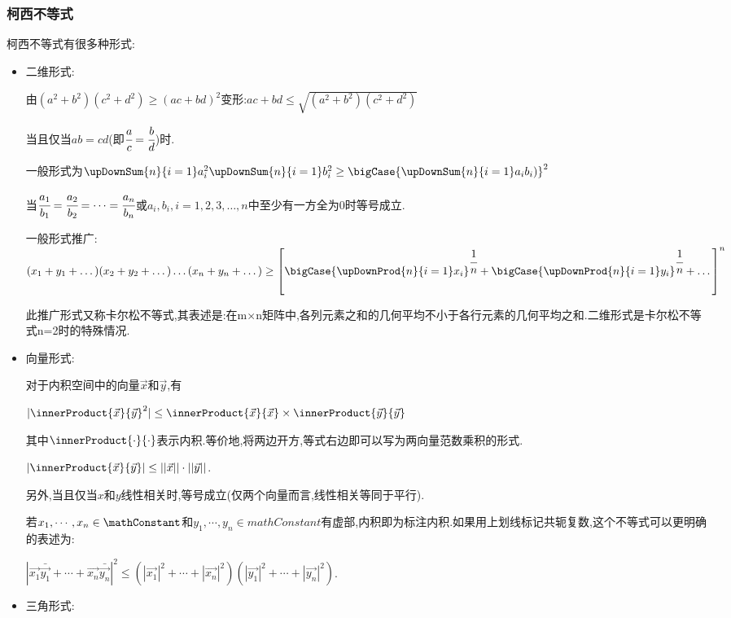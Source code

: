 {{\subsubsection{柯西不等式}{
    柯西不等式有很多种形式:
    \begin{itemize}
        \item {
              二维形式:

              由$(a^2 + b^2)(c^2 + d^2)\geq(ac + bd)^2$变形:$ac + bd \leq \sqrt{(a^2 + b^2)(c^2 + d^2)}$

              当且仅当$ab = cd$(即$\cfrac{a}{c} = \cfrac{b}{d}$)时.

              一般形式为$\upDownSum{n}{i = 1}a_i^2\upDownSum{n}{i = 1}b_i^2\geq\bigCase{\upDownSum{n}{i = 1}a_ib_i)}^2$

              当$\cfrac{a_1}{b_1} = \cfrac{a_2}{b_2} = \dots = \cfrac{a_n}{b_n}$或$a_i,b_i,i = 1,2,3,\dots,n$中至少有一方全为$0$时等号成立.

              一般形式推广:$(x_1 + y_1 + \dots)(x_2 + y_2 + \dots)\dots(x_n + y_n + \dots) \geq \left[\bigCase{\upDownProd{n}{i = 1}x_i}^{\cfrac{1}{n}} + \bigCase{\upDownProd{n}{i = 1}y_i}^{\cfrac{1}{n}} + \dots\right]^n$

              此推广形式又称卡尔松不等式,其表述是:在m×n矩阵中,各列元素之和的几何平均不小于各行元素的几何平均之和.二维形式是卡尔松不等式n=2时的特殊情况.
              }
        \item {
              向量形式:

              对于内积空间中的向量$\vec{x}$和$\vec{y}$,有

              $|\innerProduct{\vec{x}}{\vec{y}}^2| \leq \innerProduct{\vec{x}}{\vec{x}} \times \innerProduct{\vec{y}}{\vec{y}}$

              其中$\innerProduct{\cdot}{\cdot}$表示内积.等价地,将两边开方,等式右边即可以写为两向量范数乘积的形式.

              $|\innerProduct{\vec{x}}{\vec{y}}| \leq ||\vec{x}||\cdot||\vec{y}||$.

              另外,当且仅当$x$和$y$线性相关时,等号成立(仅两个向量而言,线性相关等同于平行).

              若$x_1,\dotsm,x_n \in \mathConstant$和$y_1,\dotsm,y_n \in mathConstant$有虚部,内积即为标注内积.如果用上划线标记共轭复数,这个不等式可以更明确的表述为:

              $|\vec{x_1}\bar{\vec{y_1}} + \dotsm + \vec{x_n}\bar{\vec{y_n}}|^2\leq (|\vec{x_1}|^2 + \dotsm + |\vec{x_n}|^2)(|\vec{y_1}|^2 + \dotsm + |\vec{y_n}|^2)$.
              }
        \item {
              三角形式:

}
\end{itemize}}}}
